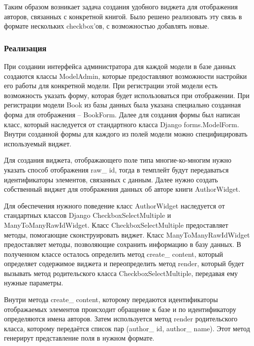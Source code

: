 \documentclass[a4paper]{report}
\begin{document}
Таким образом возникает задача создания удобного виджета для отображения авторов, связанных с конкретной книгой.
Было решено реализовать эту связь в формате нескольких checkbox'ов, с возможностью добавлять
новые.

\subsubsection{Реализация}

При создании интерфейса администратора для каждой модели в базе данных создаются классы ModelAdmin, которые предоставляют возможности настройки его работы для конкретной модели. При регистрации этой модели есть возможность указать форму, которая будет использоваться при отображении. При регистрации модели Book из базы данных была указана специально созданная форма для отображения -- BookForm. Далее для создания формы был написан класс, который наследуется от стандартного класса Django forms.ModelForm. Внутри созданной формы для каждого из полей модели можно специфицировать используемый виджет.

Для создания виджета, отображающего поле типа многие-ко-многим нужно указать способ отображения raw\_ id, тогда в темплейт будут передаваться идентификаторы элементов, связанных с данным. Далее нужно создать собственный виджет для отображения данных об авторе книги AuthorWidget. 

Для обеспечения нужного поведение класс AuthorWidget наследуется от стандартных классов Django CheckboxSelectMultiple и ManyToManyRawIdWidget. Класс CheckboxSelectMultiple предоставляет методы, помогающие сконструировать виджет. Класс ManyToManyRawIdWidget предоставляет методы, позволяющие сохранить информацию в базу данных. В полученном классе осталось определить метод create\_ content, который определяет содержимое виджета и переопределить метод render, который будет вызывать метод родительского класса CheckboxSelectMultiple, передавая ему нужные параметры. 

Внутри метода create\_ content, которому передаются идентификаторы отображаемых элементов происходит обращение к базе и по идентификатору определяются имена авторов. Затем используется метод render родительского класса, которому передаётся список пар (author\_ id, author\_ name). Этот метод генерирут представление поля в нужном формате.
\end{document}
